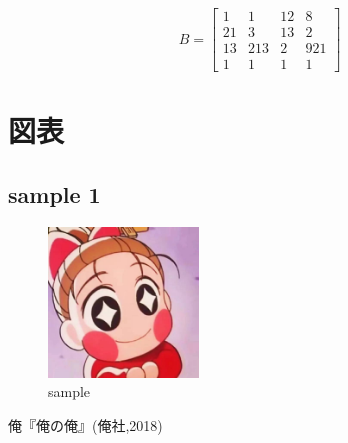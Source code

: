 \documentclass[twocolumn]{jsarticle}
\begin{document}
			\begin{equation*}
				B = 
				\begin{bmatrix}
					1&1&12&8 \\
					21&3&13&2 \\
					13&213&2&921 \\
					1&1&1&1
				\end{bmatrix}
			\end{equation*}

	\section{図表}
	\subsection{sample 1}
		\begin{figure}[H]
			\centering
			\includegraphics[width=4cm]{image-1.jpg}
			\caption{sample}
		\end{figure}

	\begin{thebibliography}{9}
		 俺『俺の俺』(俺社,2018)
	\end{thebibliography}
\end{document}

